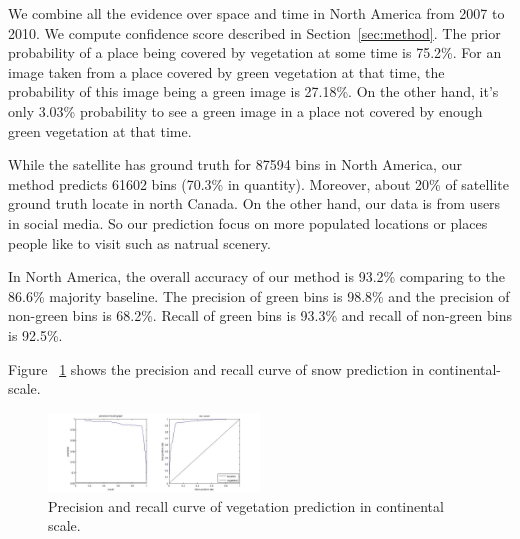 \documentclass[10pt,journal,compsoc]{IEEEtran}
\begin{document}
We combine all the evidence over space and time in North America from 2007 to 2010. We compute confidence score described in Section~\ref{sec:method}. 
The prior probability of a place being covered by vegetation at some time is 75.2\%.
For an image taken from a place covered by green vegetation at that time, the probability of this image being a green image is 27.18\%. On the other hand, it's only 3.03\% probability to see a green image in a place not covered by enough green vegetation at that time.


While the satellite has ground truth for 87594 bins in North America, our method predicts 61602 bins (70.3\% in quantity). Moreover, about 20\% of satellite ground truth locate in north Canada. On the other hand, our data is from users in social media. So our prediction focus on more populated locations or places people like to visit such as natrual scenery.

In North America, the overall accuracy of our method is 93.2\% comparing to the 86.6\% majority baseline. The precision of green bins is 98.8\% and the precision of non-green bins is 68.2\%. Recall of green bins is 93.3\% and recall of non-green bins is 92.5\%.

Figure ~\ref{fig:curvevege} shows the precision and recall curve of snow prediction in continental-scale.
\begin{figure}
\begin{center}

\includegraphics[width=0.5\textwidth]{curvevege.jpg}


\end{center}
\vspace{-24pt}
\caption{Precision and recall curve of vegetation prediction in continental scale.}
\label{fig:curvevege}
\vspace{-12pt}
\end{figure}
\end{document}
